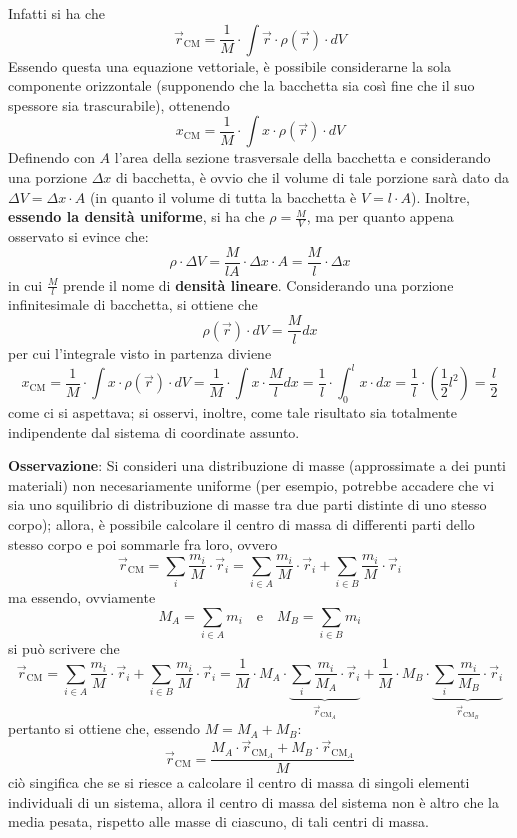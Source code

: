 \documentclass[a4paper]{extarticle}
\begin{document}
\vspace{1em}
\noindent
Infatti si ha che
\[\vec r_{\text{CM}} = \frac{1}{M} \cdot \int \vec r \cdot \rho(\vec r) \cdot dV\]
Essendo questa una equazione vettoriale, è possibile considerarne la sola componente orizzontale (supponendo che la bacchetta sia così fine che il suo spessore sia trascurabile), ottenendo
\[x_{\text{CM}}=\frac{1}{M} \cdot \int x \cdot \rho(\vec r) \cdot dV\]
Definendo con $A$ l'area della sezione trasversale della bacchetta e considerando una porzione $\Delta x$ di bacchetta, è ovvio che il volume di tale porzione sarà dato da $\Delta V = \Delta x \cdot A$ (in quanto il volume di tutta la bacchetta è $V=l \cdot A$). Inoltre, \textbf{essendo la densità uniforme}, si ha che $\rho = \frac{M}{V}$, ma per quanto appena osservato si evince che:
\[\rho \cdot \Delta V = \frac{M}{lA} \cdot \Delta x \cdot A = \frac{M}{l} \cdot \Delta x\]
in cui $\frac{M}{l}$ prende il nome di \textbf{densità lineare}. Considerando una porzione infinitesimale di bacchetta, si ottiene che
\[\rho(\vec r) \cdot dV = \frac{M}{l} dx\]
per cui l'integrale visto in partenza diviene
\[x_{\text{CM}} = \frac{1}{M} \cdot \int x \cdot \rho(\vec r) \cdot dV = \frac{1}{M} \cdot \int x \cdot \frac{M}{l} dx = \frac{1}{l} \cdot \int_0^l x \cdot dx = \frac{1}{l} \cdot \left(\frac{1}{2}l^2\right) = \frac{l}{2}\]
come ci si aspettava; si osservi, inoltre, come tale risultato sia totalmente indipendente dal sistema di coordinate assunto.

\vspace{1em}
\noindent
\textbf{Osservazione}: Si consideri una distribuzione di masse (approssimate a dei punti materiali) non necesariamente uniforme (per esempio, potrebbe accadere che vi sia uno squilibrio di distribuzione di masse tra due parti distinte di uno stesso corpo); allora, è possibile calcolare il centro di massa di differenti parti dello stesso corpo e poi sommarle fra loro, ovvero
\[\vec r_{\text{CM}} = \sum_i \frac{m_i}{M} \cdot \vec r_i = \sum_{i \in A} \frac{m_i}{M} \cdot \vec r_i + \sum_{i \in B} \frac{m_i}{M} \cdot \vec r_i\]
ma essendo, ovviamente
\[M_{A} = \sum_{i \in A} m_i \hspace{1em} \text{e} \hspace{1em} M_{B} = \sum_{i \in B} m_i\]
si può scrivere che
\[\vec r_{\text{CM}} = \sum_{i \in A} \frac{m_i}{M} \cdot \vec r_i + \sum_{i \in B} \frac{m_i}{M} \cdot \vec r_i = \frac{1}{M} \cdot M_A \cdot \underbrace{\sum_i \frac{m_i}{M_A} \cdot \vec r_i}_{\vec r_{\text{CM}_A}} + \frac{1}{M} \cdot M_B \cdot \underbrace{\sum_i \frac{m_i}{M_B} \cdot \vec r_i}_{\vec r_{\text{CM}_B}}\]
pertanto si ottiene che, essendo $M=M_A+M_B$:
\[\boxed{\vec r_{\text{CM}} = \frac{M_A \cdot \vec r_{\text{CM}_A} + M_B \cdot \vec r_{\text{CM}_A}}{M}}\]
ciò singifica che se si riesce a calcolare il centro di massa di singoli elementi individuali di un sistema, allora il centro di massa del sistema non è altro che la media pesata, rispetto alle masse di ciascuno, di tali centri di massa.
\end{document}
